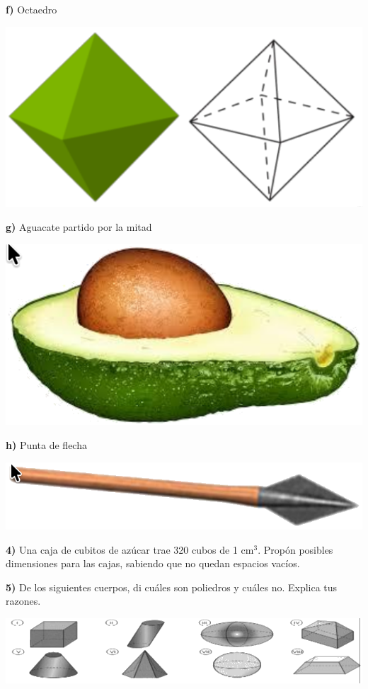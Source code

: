 \documentclass[12pt,a4paper]{article}
\begin{document}
\begin{multicols}{2}
\textbf{f)} Octaedro

\begin{center}
\includegraphics[width=0.75\columnwidth]{Figuras/fig39.png}
\end{center}

\textbf{g)} Aguacate partido por la mitad

\begin{center}
\includegraphics[width=0.75\columnwidth]{Figuras/fig40.png}
\end{center}

\textbf{h)} Punta de flecha

\begin{center}
\includegraphics[width=0.75\columnwidth]{Figuras/fig41.png}
\end{center}

\textbf{4)} Una caja de cubitos de azúcar trae 320 cubos de 1 cm$^3$. Propón posibles dimensiones para las cajas, sabiendo que no quedan espacios vacíos.

\vspace{4mm}


\textbf{5)} De los siguientes cuerpos, di cuáles son poliedros y cuáles no. Explica tus razones.
\begin{center}
	\includegraphics[width=0.75\columnwidth]{Figuras/fig46.png}
\end{center}


\end{multicols}
\end{document}
